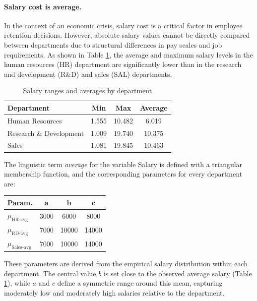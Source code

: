 \documentclass[runningheads]{llncs}
\begin{document}
\paragraph{Salary cost is average.} In the context of an economic crisis, salary cost is a critical factor in employee retention decisions. However, absolute salary values cannot be directly compared between departments due to structural differences in pay scales and job requirements. As shown in Table \ref{tab:salary}, the average and maximum salary levels in the human resources (HR) department are significantly lower than in the research and development (R\&D) and sales (SAL) departments.
\vspace{-1.5em}
\begin{table}
\centering
\small 
\caption{Salary ranges and averages by department\label{tab:salary}}
\begin{tabular}{|l|c|c|c|}
\hline
Department & Min & Max & Average \\ \hline
Human Resources        & 1.555 & 10.482 & 6.019 \\ \hline
Research \& Development & 1.009 & 19.740 & 10.375 \\ \hline
Sales                  & 1.081 & 19.845 & 10.463 \\ \hline
\end{tabular} 
\end{table}
\vspace{-1.5em}

The linguistic term \textit{average} for the variable Salary is defined with a triangular membership function, and the corresponding parameters for every department are: 

\begin{center}
\small
\begin{tabular}{|l|c|c|c|}
\hline
Param. & a & b & c \\
\hline
$\mu_{\text{HR-avg}}$   & 3000 & 6000 & 8000  \\
\hline
$\mu_{\text{RD-avg}}$    & 7000 & 10000 & 14000 \\
\hline
$\mu_{\text{Sales-avg}}$ &  7000 & 10000 & 14000 \\
\hline
\end{tabular} 
\end{center}

These parameters are derived from the empirical salary distribution within each department. The central value $b$ is set close to the observed average salary (Table \ref{tab:salary}), while $a$ and $c$ define a symmetric range around this mean, capturing moderately low and moderately high salaries relative to the department.
\end{document}
